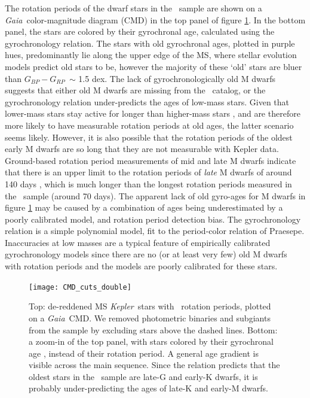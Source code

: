 \documentclass{aastex63}
\newcommand{\eg}{{\it e.g.}}
\newcommand{\kepler}{{\it Kepler}}
\newcommand{\gaia}{{\it Gaia}}
\newcommand{\gcolor}{$G_{BP} - G_{RP}$}
\newcommand{\mct}{\citet{mcquillan2014}}
\begin{document}
The rotation periods of the dwarf stars in the \mct\ sample are shown on a
\gaia\ color-magnitude diagram (CMD) in the top panel of figure
\ref{fig:age_gradient}.
In the bottom panel, the stars are colored by their gyrochronal age,
calculated using the \citet{angus2019} gyrochronology relation.
The stars with old gyrochronal ages, plotted in purple hues, predominantly lie
along the upper edge of the MS, where stellar evolution models predict old
stars to be, however the majority of these `old' stars are bluer than \gcolor\
$\sim$ 1.5 dex.
The lack of gyrochronologically old M dwarfs suggests that either old M dwarfs
are missing from the \mct\ catalog, or the \citet{angus2019} gyrochronology
relation under-predicts the ages of low-mass stars.
Given that lower-mass stars stay active for longer than higher-mass stars
\citep[\eg][]{west2008, newton2017, kiman2019}, and are therefore more likely
to have measurable rotation periods at old ages, the latter scenario seems
likely.
However, it is also possible that the rotation periods of the oldest early M
dwarfs are so long that they are not measurable with Kepler data.
Ground-based rotation period measurements of mid and late M dwarfs indicate
that there is an upper limit to the rotation periods of {\it late} M dwarfs of
around 140 days \citep{newton2016, newton2018}, which is much
longer than the longest rotation periods measured in the \mct\ sample (around
70 days).
The apparent lack of old gyro-ages for M dwarfs in figure
\ref{fig:age_gradient} may be caused by a combination of ages being
underestimated by a poorly calibrated model, and rotation period detection
bias.
The \citet{angus2019} gyrochronology relation is a simple polynomial model,
fit to the period-color relation of Praesepe.
Inaccuracies at low masses are a typical feature of empirically calibrated
gyrochronology models since there are no (or at least very few) old M dwarfs
with rotation periods and the models are poorly calibrated for these stars.
\begin{figure}
  \caption{
      Top: de-reddened MS \kepler\ stars with \mct\ rotation periods, plotted
    on a \gaia\ CMD.
    We removed photometric binaries and subgiants from the sample by excluding
    stars above the dashed lines.
    Bottom: a zoom-in of the top panel, with stars colored by their
    gyrochronal age \citep{angus2019}, instead of their rotation period.
    A general age gradient is visible across the main sequence.
    Since the \citet{angus2019} relation predicts that the oldest stars in
    the \mct\ sample are late-G and early-K dwarfs, it is probably
    under-predicting the ages of late-K and early-M dwarfs.
}
  \centering
    \texttt{[image: CMD\_cuts\_double]}
\label{fig:age_gradient}
\end{figure}
\end{document}
